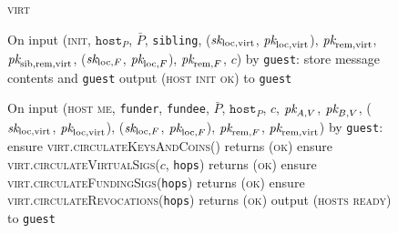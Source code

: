 \begin{figure}[H]
  \begin{processbox}{\textsc{virt}}
    \begin{algorithmic}[1]
      \State On input (\textsc{init}, $\texttt{host}_P$, $\bar{P}$,
      \texttt{sibling}, ($\textit{sk}_{\mathrm{loc}, \mathrm{virt}}$, $\textit{pk}_{\mathrm{loc},
      \mathrm{virt}}$), $\textit{pk}_{\mathrm{rem}, \mathrm{virt}}$, $\textit{pk}_{\mathrm{sib},
      \mathrm{rem}, \mathrm{virt}}$, ($\textit{sk}_{\mathrm{loc}, F}$, $\textit{pk}_{\mathrm{loc},
      F}$), $\textit{pk}_{\mathrm{rem}, F}$, $c$) by \texttt{guest}:
      \Indent
        \State store message contents and \texttt{guest}
        \State output (\textsc{host init ok}) to \texttt{guest}
      \EndIndent
      \Statex

      \State On input (\textsc{host me}, \texttt{funder}, \texttt{fundee},
      $\bar{P}$, $\texttt{host}_P$, $c$, $\textit{pk}_{A, V}$, $\textit{pk}_{B, V}$,
      ($\textit{sk}_{\mathrm{loc}, \mathrm{virt}}$, $\textit{pk}_{\mathrm{loc}, \mathrm{virt}}$),
      ($\textit{sk}_{\mathrm{loc}, F}$, $\textit{pk}_{\mathrm{loc}, F}$), $\textit{pk}_{\mathrm{rem}, F}$,
      $\textit{pk}_{\mathrm{rem}, \mathrm{virt}}$) by \texttt{guest}:
      \State {}
      \Indent
        \State ensure \textsc{virt.circulateKeysAndCoins}() returns (\textsc{ok})
        \State ensure \textsc{virt.circulateVirtualSigs}($c$, \texttt{hops})
        returns (\textsc{ok})
        \State ensure \textsc{virt.circulateFundingSigs}(\texttt{hops}) returns
        (\textsc{ok})
        \State ensure \textsc{virt.circulateRevocations}(\texttt{hops}) returns
        (\textsc{ok})
        \State output (\textsc{hosts ready}) to \texttt{guest}
      \EndIndent
      \Statex


\end{algorithmic}
\end{processbox}
\end{figure}
